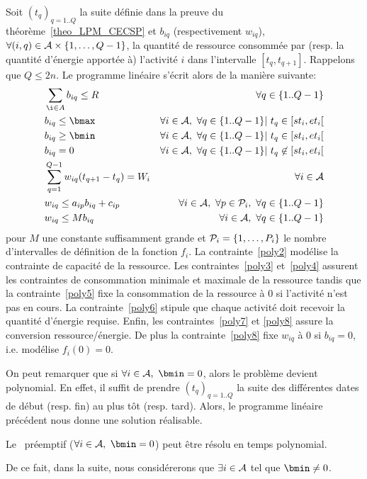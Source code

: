 Soit $(t_q)_{q=1..Q}$ la suite définie dans la preuve du
théorème~\ref{theo_LPM_CECSP} et $b_{iq}$ (respectivement $w_{iq}$),
$\forall (i,q) \in \A\times\{1,\dots,Q-1\}$, la
quantité de ressource consommée par (resp. la quantité d'énergie
apportée à) l'activité $i$ dans l'intervalle
$[t_q,t_{q+1}]$. Rappelons que $Q \le 2n$. Le programme linéaire
s'écrit alors de la manière suivante:
{\small
\begin{align}
&\sum_{\i \in A} b_{iq} \le R & \forall q\in
\{1..Q-1\} \label{poly2}\\ & b_{iq} \le \bmax & \forall i \in \A,\
\forall q \in \{1..Q-1\} |\ t_q \in [st_i,et_i[\label{poly3}\\ &
b_{iq} \ge \bmin& \forall i \in \A,\ \forall q \in \{1..Q-1\} |\ t_q
\in [st_i,et_i[\label{poly4}\\ & b_{iq}=0 & \forall i \in \A,\ \forall
q \in \{1..Q-1\} |\ t_q \not\in [st_i,et_i[\label{poly5}\\ &
\sum_{q=1}^{Q-1} w_{iq}(t_{q+1}-t_q) = W_i & \forall i \in
\A\label{poly6}\\ & w_{iq} \le a_{ip}b_{iq} + c_{ip} & \forall i \in
\A,\ \forall p \in \P_i,\ \forall q \in \{1..Q-1\}\label{poly7}\\ &
w_{iq} \le Mb_{iq} & \forall i \in \A,\ \forall q \in
\{1..Q-1\}\label{poly8}
\end{align} }
pour $M$ une constante suffisamment grande et $\P_i=\{1,\dots,P_i\}$
le nombre d'intervalles de définition de la fonction $f_i$. La
contrainte~\eqref{poly2} modélise la contrainte de capacité de la
ressource. Les contraintes~\eqref{poly3} et~\eqref{poly4} assurent les
contraintes de consommation minimale et maximale de la ressource
tandis que la contrainte~\eqref{poly5} fixe la consommation de la
ressource à $0$ si l'activité n'est pas en cours. La
contrainte~\eqref{poly6} stipule que chaque activité doit recevoir la
quantité d'énergie requise. Enfin, les contraintes~\eqref{poly7} et
\eqref{poly8} assure la conversion ressource/énergie. De plus la
contrainte~\eqref{poly8} fixe $w_{iq}$ à $0$ si $b_{iq}=0$,
i.e. modélise $f_i(0)=0$.

On peut remarquer que si $\forall i \in \A,\ \bmin=0$, alors le
problème devient polynomial. En effet, il suffit de prendre 
$(t_q)_{q=1..Q}$ la suite des différentes dates de début (resp. fin)
au plus tôt (resp. tard). Alors, le programme linéaire précédent nous
donne une solution réalisable. 

\begin{theo}
Le \CECSP~préemptif ($\forall i \in \A,\ \bmin=0$) peut être résolu en
temps polynomial.
\end{theo}

De ce fait, dans la suite, nous considérerons que $\exists i \in \A$
tel que $\bmin\neq 0$.
